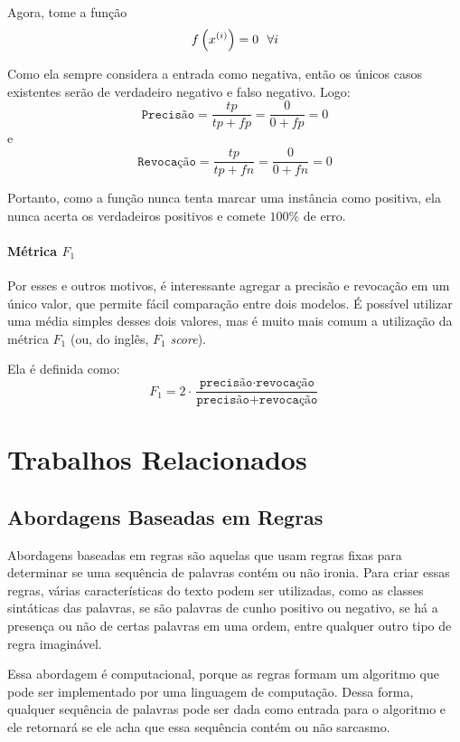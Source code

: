 Agora, tome a função
\begin{equation}
  f\paren{\xii[x]{i}} = 0~~\forall i
\end{equation}

Como ela sempre considera a entrada como negativa, então os únicos casos
existentes serão de verdadeiro negativo e falso negativo. Logo:
\[
\texttt{Precisão} = \dfrac{tp}{tp+fp} = \dfrac{0}{0+fp} = 0
\]
e
\[
\texttt{Revocação} = \dfrac{tp}{tp+fn} = \dfrac{0}{0+fn} = 0
\]

Portanto, como a função nunca tenta marcar uma instância como positiva, ela
nunca acerta os verdadeiros positivos e comete $100\%$ de erro.

\paragraph{Métrica $F_1$}%
\label{par:metrica_f_1_}

Por esses e outros motivos, é interessante agregar a precisão e revocação em um
único valor, que permite fácil comparação entre dois modelos. É possível
utilizar uma média simples desses dois valores, mas é muito mais comum a
utilização da métrica $F_1$ (ou, do inglês, $F_1$ \textit{score}).

Ela é definida como:
\[
F_1=2\cdot
\dfrac{\texttt{precisão}\cdot\texttt{revocação}}
{\texttt{precisão}+\texttt{revocação}}
\]

\section{Trabalhos Relacionados}%
\label{sec:trabalhos_relacionados}

\subsection{Abordagens Baseadas em Regras}%
\label{sub:abordagens_baseados_em_regras}

Abordagens baseadas em regras são aquelas que usam regras fixas para determinar
se uma sequência de palavras contém ou não ironia. Para criar essas regras,
várias características do texto podem ser utilizadas, como as classes sintáticas
das palavras, se são palavras de cunho positivo ou negativo, se há a presença ou
não de certas palavras em uma ordem, entre qualquer outro tipo de regra
imaginável.

Essa abordagem é computacional, porque as regras formam um algoritmo que pode
ser implementado por uma linguagem de computação. Dessa forma, qualquer
sequência de palavras pode ser dada como entrada para o algoritmo e ele
retornará se ele acha que essa sequência contém ou não sarcasmo.


